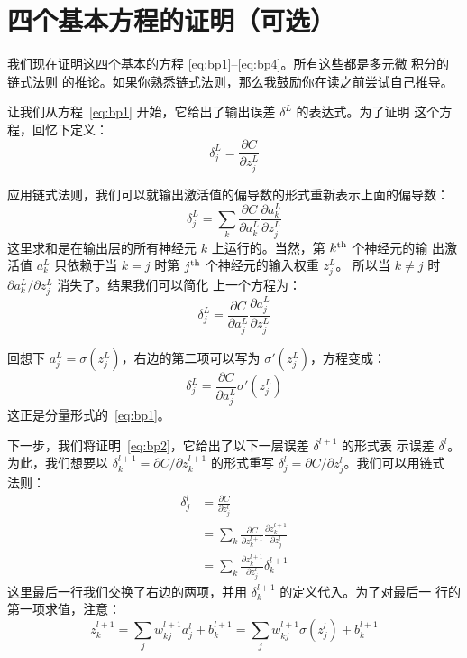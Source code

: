 \section{四个基本方程的证明（可选）}
\label{sec:proof_of_the_four_fundamental_equations}

我们现在证明这四个基本的方程 \eqref{eq:bp1}--\eqref{eq:bp4}。所有这些都是多元微
积分的\href{https://en.wikipedia.org/wiki/Chain_rule}{链式法则}%
的推论。如果你熟悉链式法则，那么我鼓励你在读之前尝试自己推导。

让我们从方程~\eqref{eq:bp1} 开始，它给出了输出误差 $\delta^L$ 的表达式。为了证明
这个方程，回忆下定义：
\begin{equation}
  \delta^L_j = \frac{\partial C}{\partial z^L_j}
\label{eq:36}\tag{36}
\end{equation}

应用链式法则，我们可以就输出激活值的偏导数的形式重新表示上面的偏导数：
\begin{equation}
  \delta^L_j = \sum_k \frac{\partial C}{\partial a^L_k} \frac{\partial a^L_k}{\partial z^L_j}
\label{eq:37}\tag{37}
\end{equation}
这里求和是在输出层的所有神经元 $k$ 上运行的。当然，第 $k^{\rm th}$ 个神经元的输
出激活值 $a^L_k$ 只依赖于当 $k=j$ 时第 $j^{\rm th}$ 个神经元的输入权重 $z^L_j$。
所以当 $k \neq j$ 时 $\partial a^L_k / \partial z^L_j$ 消失了。结果我们可以简化
上一个方程为：
\begin{equation}
  \delta^L_j = \frac{\partial C}{\partial a^L_j} \frac{\partial a^L_j}{\partial z^L_j}
\label{eq:38}\tag{38}
\end{equation}

回想下 $a^L_j = \sigma(z^L_j)$，右边的第二项可以写为 $\sigma'(z^L_j)$，方程变成：
\begin{equation}
  \delta^L_j = \frac{\partial C}{\partial a^L_j} \sigma'(z^L_j)
\label{eq:39}\tag{39}
\end{equation}
这正是分量形式的~\eqref{eq:bp1}。

下一步，我们将证明~\eqref{eq:bp2}，它给出了以下一层误差 $\delta^{l+1}$ 的形式表
示误差 $\delta^l$。为此，我们想要以 $\delta^{l+1}_k = \partial C / \partial
z^{l+1}_k$ 的形式重写 $\delta^l_j = \partial C / \partial z^l_j$。我们可以用链式
法则：
\begin{align}
  \delta^l_j &= \frac{\partial C}{\partial z^l_j} \label{eq:40}\tag{40}\\
             &= \sum_k \frac{\partial C}{\partial z^{l+1}_k} \frac{\partial z^{l+1}_k}{\partial z^l_j} \label{eq:41}\tag{41}\\
             &= \sum_k \frac{\partial z^{l+1}_k}{\partial z^l_j} \delta^{l+1}_k \label{eq:42}\tag{42}
\end{align}
这里最后一行我们交换了右边的两项，并用 $\delta^{l+1}_k$ 的定义代入。为了对最后一
行的第一项求值，注意：
\begin{equation}
  z^{l+1}_k = \sum_j w^{l+1}_{kj} a^l_j +b^{l+1}_k = \sum_j w^{l+1}_{kj} \sigma(z^l_j) +b^{l+1}_k
\label{eq:43}\tag{43}
\end{equation}

